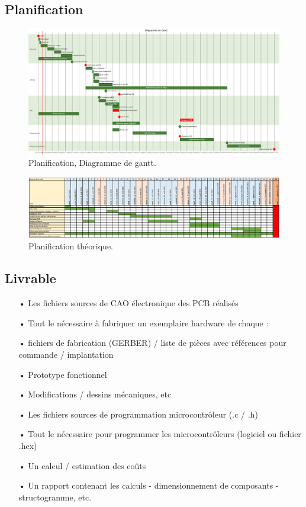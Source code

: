 \subsection{Planification}
\begin{figure}[h]
	\centering
	\includegraphics[width=1\linewidth]{../figures/cdc/planif}
	\caption{Planification, Diagramme de gantt.}
	\label{fig:planification}
\end{figure}
\begin{figure}[h]
	\centering
	\includegraphics[width=1\linewidth]{../figures/cdc/planif_theorique}
	\caption{Planification théorique.}
	\label{fig:planiftheorique}
\end{figure}


\subsection{Livrable}
\begin{itemize}
	\item[•] Les fichiers sources de CAO électronique des PCB réalisés
	\item[•] Tout le nécessaire à fabriquer un exemplaire hardware de chaque :
	\item[•] fichiers de fabrication (GERBER) / liste de pièces avec références pour commande / implantation
	\item[•] Prototype fonctionnel
	\item[•] Modifications / dessins mécaniques, etc
	\item[•] Les fichiers sources de programmation microcontrôleur (.c  / .h)
	\item[•] Tout le nécessaire pour programmer les microcontrôleurs (logiciel ou fichier .hex)
	\item[•] Un calcul / estimation des coûts
	\item[•] Un rapport contenant les calculs - dimensionnement de composants - structogramme, etc.
\end{itemize}

\clearpage
